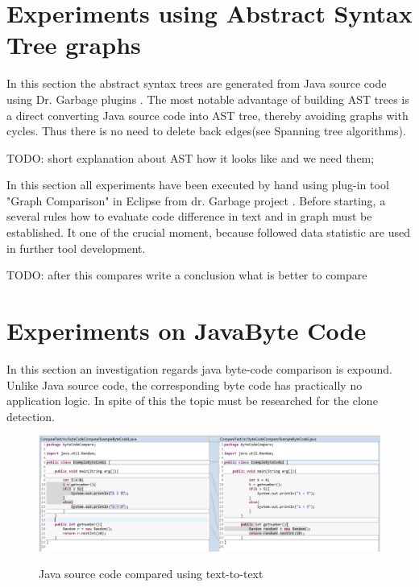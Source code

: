\documentclass{report}
\begin{document}
\section{Experiments using Abstract Syntax Tree graphs}

In this section the abstract syntax trees are generated from Java source code using Dr. Garbage plugins \cite{drgarbage}.
The most notable advantage of building AST trees is a direct converting Java source code into AST tree, thereby avoiding graphs with cycles. Thus there is no need to delete back edges(see Spanning tree algorithms).

TODO: short explanation about AST how it looks like and we need them;

In this section all experiments have been executed by hand using plug-in tool "Graph Comparison" in Eclipse from dr. Garbage project \cite{drgarbage}.  Before starting, a several rules how to evaluate code difference in text and in graph must be established. It one of the crucial moment, because followed data statistic are used in further tool development.

TODO: after this compares write a conclusion what is better to compare



\section{Experiments on JavaByte Code}
\label{sec: java-code-experiments}

In this section an investigation regards java byte-code comparison is expound. Unlike Java source code, the corresponding byte code has practically no application logic. In spite of this the topic must be researched for the clone detection.

\begin{figure}[h]
  \centering
  \includegraphics[width=1.00\textwidth]{Figures/bytecode-compare/example-of-bytecode-original-compared}\\[0.1cm]
  \caption[Functions compared by members]{Java source code compared using text-to-text}
  \label{fig:example-of-bytecode-original-compared}
\end{figure}
\end{document}
